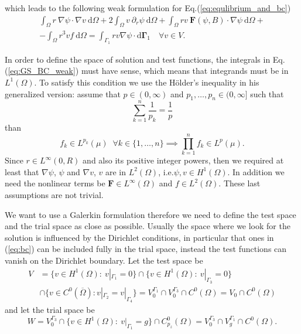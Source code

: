 which leads to the following weak formulation for Eq.(\ref{eq:equlibrium_and_bc})
\begin{equation}\label{eq:GS_BC_weak}
  \begin{split}
    \int_\Omega r\:\nabla\psi \cdot\nabla v\:\mathrm{d}\Omega+2\int_\Omega v\:\partial_r \psi\:\mathrm{d}\Omega+\int_\Omega rv\:\mathbf{F}(\psi,B)\cdot\nabla\psi\:\mathrm{d}\Omega +\\ -\int_\Omega r^3vf\:\mathrm{d}\Omega =\int_{\Gamma_1} rv\nabla \psi\cdot\mathrm{d}\mathbf{\Gamma}_1\quad\forall v\in V.
  \end{split}
\end{equation}
\medskip

In order to define the space of solution and test functions, the integrals in Eq.(\ref{eq:GS_BC_weak}) must have sense, which means that integrands must be in $L^1(\Omega)$. To satisfy this condition we use the H\"{o}lder's inequality in his generalized version: assume that $p\in(0, \infty)$ and $p_1,\dots, p_n  \in (0, \infty]$ such that
\begin{equation}
  \sum_{k=1}^n \frac1{p_k}=\frac{1}{p}
\end{equation}
than
\begin{equation}
  f_k\in L^{p_k}(\mu)\;\;\forall k\in\{1,\ldots,n\}\implies\prod_{k=1}^n f_k \in L^p(\mu).
\end{equation}
Since $r\in L^\infty(0,R)$ and also its positive integer powers, then we required at least that $\nabla \psi$, $\psi$ and $\nabla v$, $v$ are in $L^2(\Omega)$,
i.e.$\psi,v\in H^1(\Omega)$. In addition we need the nonlinear terms be $\mathbf{F}\in L^\infty(\Omega)$ and $f\in L^2(\Omega)$. These last assumptions are not trivial.
\medskip

We want to use a Galerkin formulation therefore we need to define the test space and the trial space as close as possible. Usually the space where we look for the solution is influenced by the Dirichlet conditions, in particular that ones in (\ref{eq:bc}) can be included fully in the trial space, instead the test functions can vanish on the Dirichlet boundary. Let the test space be
\begin{equation}\label{eq:test_space}
\begin{split}
 V&=\{v\in H^1(\Omega):\:v|_{\Gamma_1}=0\}\cap\{v\in H^1(\Omega):\:v|_{\Gamma_3}=0 \}\\
&\cap\{v\in C^0(\overline{\Omega}):v|_{\Gamma_2}=v|_{\Gamma_4}\}=V_0^{\Gamma_1}\cap V_0^{\Gamma_3} \cap C^0(\Omega)=V_0 \cap C^0(\Omega)
\end{split}
\end{equation}
and let the trial space be
\begin{equation}\label{eq:trial_space}
 W=V_0^{\Gamma_3}\cap\{v\in H^1(\Omega):\:v|_{\Gamma_1}=g \}\cap C^0_{p_z}(\Omega)=V_0^{\Gamma_3}\cap V_g^{\Gamma_1}\cap C^0(\Omega).
\end{equation}

